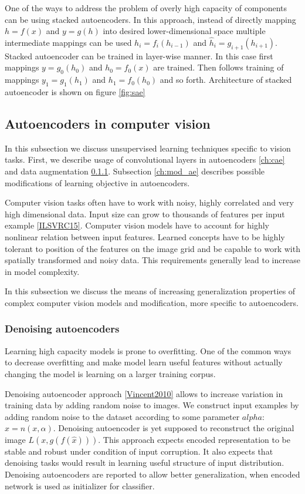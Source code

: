 One of the ways to address the problem of overly high capacity of components can be using stacked autoencoders.
In this approach, instead of directly mapping $h=f(x)$ and $y=g(h)$ into desired lower-dimensional space multiple intermediate mappings can be used $h_i=f_i(h_{i-1})$ and $\hat{h}_i=g_{i+1}(h_{i+1})$.
Stacked autoencoder can be trained in layer-wise manner.
In this case first mappings $y=g_0(h_0)$ and $h_0=f_0(x)$ are trained.
Then follows training of mappings $y_1=g_1(h_1)$ and $h_1=f_0(h_0)$ and so forth.
Architecture of stacked autoencoder is shown on figure \ref{fig:sae}




\subsection{Autoencoders in computer vision}\label{ch:dcae}

In this subsection we discuss unsupervised learning techniques specific to vision tasks.
First, we describe usage of convolutional layers in autoencoders \ref{ch:cae} and data augmentation \ref{ch:denae}.
Subsection \ref{ch:mod_ae} describes possible modifications of learning objective in autoencoders.

Computer vision tasks often have to work with noisy, highly correlated and very high dimensional data. Input size can grow to thousands of features per input example \ref{ILSVRC15}.
Computer vision models have to account for highly nonlinear relation between input features.
Learned concepts have to be highly tolerant to position of the features on the image grid and be capable to work with spatially transformed and noisy data.
This requirements generally lead to increase in model complexity.

In this subsection we discuss the means of increasing generalization properties of complex computer vision models and modification, more specific to autoencoders.

\subsubsection{Denoising autoencoders}\label{ch:denae}

Learning high capacity models is prone to overfitting.
One of the common ways to decrease overfitting and make model learn useful features without actually changing the model is learning on a larger training corpus.

Denoising autoencoder approach \ref{Vincent2010} allows to increase variation in training data by adding random noise to images. We construct input examples by adding random noise to the dataset according to some parameter $alpha$: $\hat{x}=n(x, \alpha)$.
Denoising autoencoder is yet supposed to reconstruct  the original image $L(x, g(f(\hat{x})))$.
This approach expects encoded representation to be stable and robust under condition of input corruption.
It also expects that denoising tasks would result in learning useful structure of input distribution.
Denoising autoencoders are reported to allow better generalization, when encoded network is used as initializer for classifier.

